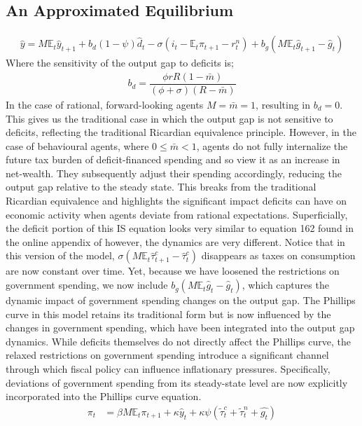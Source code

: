 \documentclass[11pt]{article}
\newcommand{\bb}{\bigbreak\noindent}
\begin{document}
\begin{spacing}{2}
\subsection{An Approximated Equilibrium}
\begin{align}
	\hat{y} = M\mathbb{E}_t \hat{y}_{t+1} + b_d (1-\psi)\hat{d}_t  - \sigma(i_t - \mathbb{E}_t \pi_{t+1} - r_t^n)  + b_g\left(M\mathbb{E}_t \hat{g}_{t+1} - \hat{g}_t\right)
\end{align}
Where the sensitivity of the output gap to deficits is;
\begin{align*}
	b_d = \dfrac{\phi r  R (1- \bar{m})}{(\phi + \sigma) (R-\bar{m})} 
\end{align*}
In the case of rational, forward-looking agents $M = \bar{m} = 1$, resulting in $b_d = 0$. This gives us the traditional case in which the output gap is not sensitive to deficits, reflecting the traditional Ricardian equivalence principle. However, in the case of behavioural agents, where $0 \leq \bar{m} < 1$, agents do not fully internalize the future tax burden of deficit-financed spending and so view it as an increase in net-wealth. They subsequently adjust their spending accordingly, reducing the output gap relative to the steady state. This breaks from  the traditional Ricardian equivalence and highlights the significant impact deficits can have on economic activity when agents deviate from rational expectations.
\bb
Superficially, the deficit portion of this IS equation looks very similar to equation 162 found in the online appendix of \cite{gabaix2020behavioural} however, the dynamics are very different. 
\bb
Notice that in this version of the model, $\sigma(M\mathbb{E}_t \hat{\tau}_{t+1}^c - \hat{\tau}_{t}^c )$ disappears as taxes on consumption are now constant over time. Yet, because we have loosened the restrictions on government spending, we now include $b_g\left(M\mathbb{E}_t \hat{g}_t - \hat{g}_t\right)$, which captures the dynamic impact of government spending changes on the output gap. 
\bb
The Phillips curve in this model retains its traditional form but is now influenced by the changes in government spending, which have been integrated into the output gap dynamics. While deficits themselves do not directly affect the Phillips curve, the relaxed restrictions on government spending introduce a significant channel through which fiscal policy can influence inflationary pressures. Specifically, deviations of government spending from its steady-state level are now explicitly incorporated into the Phillips curve equation.
\begin{align}
	\pi_t &= \beta M \mathbb{E}_t \pi_{t+1}  + \kappa \hat{y}_t  +\kappa \psi (\tilde{\tau}_t^c + \tilde{\tau}_t^n + \hat{g_t})
\end{align}



\end{spacing}
\end{document}
